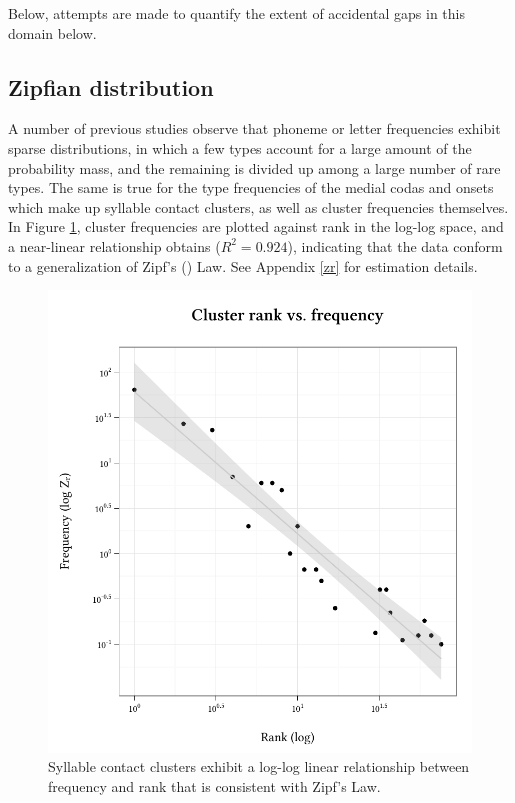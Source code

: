 \noindent Below, attempts are made to quantify the extent of accidental gaps in this domain below.

\subsection{Zipfian distribution}

A number of previous studies \citep[e.g.,][]{Weiss1961,Sigurd1968,Good1969,Borodovsky1989,Witten1990,Martindale1996,Tambovtsev2007} observe that phoneme or letter frequencies exhibit sparse distributions, in which a few types account for a large amount of the probability mass, and the remaining is divided up among a large number of rare types. The same is true for the type frequencies of the medial codas and onsets which make up syllable contact clusters, as well as cluster frequencies themselves. In Figure \ref{clus}, cluster frequencies are plotted against rank in the log-log space, and a near-linear relationship obtains ($R^2 = 0.924$), indicating that the data conform to a generalization of Zipf's (\citeyear{Zipf1949}) Law. See Appendix \ref{zr} for estimation details.

\begin{figure} \centering
\includegraphics{cluster.pdf}
\caption{Syllable contact clusters exhibit a log-log linear relationship between frequency and rank that is consistent with Zipf's Law.}
\label{clus}
\end{figure}

